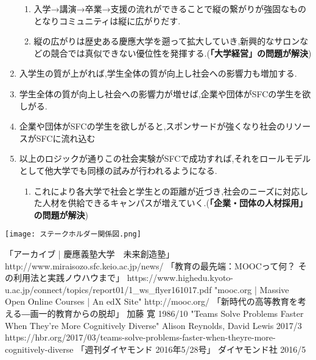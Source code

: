 \documentclass[uplatex, a4j]{jsarticle}
\begin{document}
\begin{enumerate}
\begin{enumerate}
        \item 入学→講演→卒業→支援の流れができることで縦の繋がりが強固なものとなりコミュニティは縦に広がりだす.
        \item 縦の広がりは歴史ある慶應大学を遡って拡大していき,新興的なサロンなどの競合では真似できない優位性を発揮する.(\textbf{「大学経営」の問題が解決})
      \end{enumerate}
    \item 入学生の質が上がれば,学生全体の質が向上し社会への影響力も増加する.
    \item 学生全体の質が向上し社会への影響力が増せば,企業や団体がSFCの学生を欲しがる.
    \item 企業や団体がSFCの学生を欲しがると,スポンサードが強くなり社会のリソースがSFCに流れ込む
    \item 以上のロジックが通りこの社会実験がSFCで成功すれば,それをロールモデルとして他大学でも同様の試みが行われるようになる.
      \begin{enumerate}
        \item これにより各大学で社会と学生との距離が近づき,社会のニーズに対応した人材を供給できるキャンパスが増えていく.(\textbf{「企業・団体の人材採用」の問題が解決})
      \end{enumerate}
  \end{enumerate}

  \begin{center}
    \texttt{[image: ステークホルダー関係図.png]}
  \end{center}


\begin{thebibliography}{数字}
   「アーカイブ | 慶應義塾大学　未来創造塾」 http://www.miraisozo.sfc.keio.ac.jp/news/
   「教育の最先端：MOOCって何？ その利用法と実践ノウハウまで」 https://www.highedu.kyoto-u.ac.jp/connect/topics/report01/1\_ws\_flyer161017.pdf
   "mooc.org | Massive Open Online Courses | An edX Site" http://mooc.org/
   「新時代の高等教育を考える―画一的教育からの脱却」 加藤 寛 1986/10
   "Teams Solve Problems Faster When They’re More Cognitively Diverse" Alison Reynolds, David Lewis 2017/3 https://hbr.org/2017/03/teams-solve-problems-faster-when-theyre-more-cognitively-diverse
   「週刊ダイヤモンド 2016年5/28号」 ダイヤモンド社 2016/5
\end{thebibliography}
\end{document}
